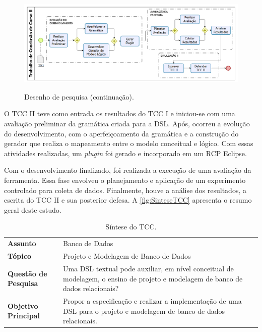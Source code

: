 \begin{figure}[!htb]
	\centering
	\caption{Desenho de pesquisa (continuação).}
		\includegraphics[width=1\textwidth]{img/DesenhoPesquisa2.png}
	\label{fig:ResearchDesign2}
\end{figure}

O \ac{TCC} II teve como entrada os resultados do \ac{TCC} I e iniciou-se com uma avaliação preliminar da gramática criada para a \ac{DSL}. 
Após, ocorreu a evolução do desenvolvimento, com o aperfeiçoamento da gramática e a construção do gerador que realiza o mapeamento entre o modelo conceitual e lógico. 
Com essas atividades realizadas, um \textit{plugin} foi gerado e incorporado em um \ac{RCP} Eclipse. 

Com o desenvolvimento finalizado, foi realizada a execução de uma avaliação da ferramenta. 
Essa fase envolveu o planejamento e aplicação de um experimento controlado para coleta de dados. 
Finalmente, houve a análise dos resultados, a escrita do \ac{TCC} II e sua posterior defesa. A \autoref{fig:SinteseTCC} apresenta o resumo geral deste estudo.


\begin{table}[!htb]
    \centering
    \caption{Síntese do TCC.}
    \begin{tabular}{m{4.5cm}|m{10cm}}
        \bottomrule
\textbf{Assunto} & Banco de Dados \\
\textbf{Tópico} &  Projeto e Modelagem de Banco de Dados\\
\textbf{Questão de Pesquisa} & Uma \ac{DSL} textual pode auxiliar, em nível conceitual de modelagem, o ensino de projeto e modelagem de banco de dados relacionais? \\
\textbf{Objetivo Principal} & Propor a especificação e realizar a implementação de uma \ac{DSL} para o projeto e modelagem de banco de dados relacionais. \\ 
        \toprule
    \end{tabular}
        \label{fig:SinteseTCC}
\end{table}

